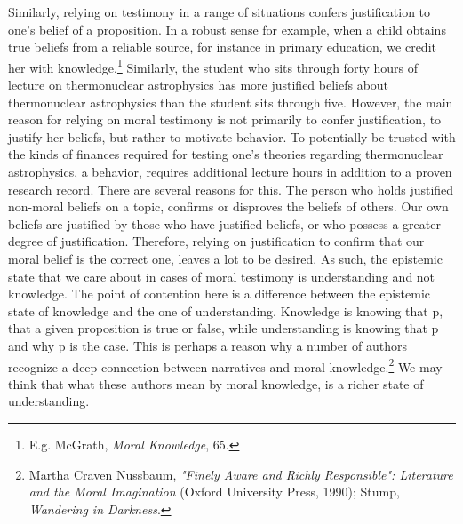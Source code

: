 \documentclass[phdthesis,12pt,final,a4paper]{wuthesis}
\theoremstyle{definition}
\theoremstyle{definition}
\theoremstyle{definition}
\theoremstyle{definition}
\theoremstyle{remark}
\begin{document}
Similarly, relying on testimony in a range of situations confers justification to one's belief of a proposition. In a robust sense for example, when a child obtains true beliefs from a reliable source, for instance in primary education, we credit her with knowledge.\footnote{E.g. McGrath, \emph{Moral {Knowledge}}, 65.} Similarly, the student who sits through forty hours of lecture on thermonuclear astrophysics has more justified beliefs about thermonuclear astrophysics than the student sits through five. However, the main reason for relying on moral testimony is not primarily to confer justification, to justify her beliefs, but rather to motivate behavior. To potentially be trusted with the kinds of finances required for testing one's theories regarding thermonuclear astrophysics, a behavior, requires additional lecture hours in addition to a proven research record. There are several reasons for this. The person who holds justified non-moral beliefs on a topic, confirms or disproves the beliefs of others. Our own beliefs are justified by those who have justified beliefs, or who possess a greater degree of justification. Therefore, relying on justification to confirm that our moral belief is the correct one, leaves a lot to be desired. As such, the epistemic state that we care about in cases of moral testimony is understanding and not knowledge. The point of contention here is a difference between the epistemic state of knowledge and the one of understanding. Knowledge is knowing that p, that a given proposition is true or false, while understanding is knowing that p and why p is the case. This is perhaps a reason why a number of authors recognize a deep connection between narratives and moral knowledge.\footnote{Martha Craven Nussbaum, \emph{"{Finely Aware} and {Richly Responsible}": {Literature} and the {Moral Imagination}} (Oxford University Press, 1990); Stump, \emph{Wandering in {Darkness}}.} We may think that what these authors mean by moral knowledge, is a richer state of understanding.
\end{document}
